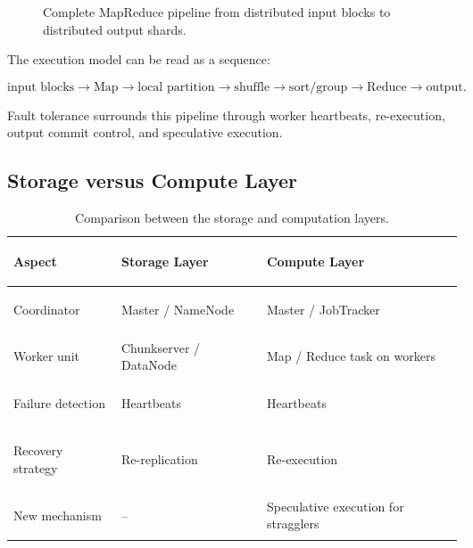 \documentclass[11pt,a4paper,oneside]{book}
\begin{document}
\begin{figure}[htbp]
\centering
{}
\caption{Complete MapReduce pipeline from distributed input blocks to distributed output shards.}
\label{fig:full-pipeline}
\end{figure}

The execution model can be read as a sequence:

\[
\text{input blocks}
\rightarrow
\text{Map}
\rightarrow
\text{local partition}
\rightarrow
\text{shuffle}
\rightarrow
\text{sort/group}
\rightarrow
\text{Reduce}
\rightarrow
\text{output}.
\]

Fault tolerance surrounds this pipeline through worker heartbeats, re-execution, output commit control, and speculative execution.

\subsection{Storage versus Compute Layer}

\begin{table}[htbp]
\centering
\caption{Comparison between the storage and computation layers.}
\label{tab:storage-compute}
\begin{tabularx}{\textwidth}{>{\bfseries\raggedright\arraybackslash}p{3.1cm} Y Y}
\toprule
{}
Aspect & Storage Layer & Compute Layer \\
\midrule
Coordinator & Master / NameNode & Master / JobTracker \\
Worker unit & Chunkserver / DataNode & Map / Reduce task on workers \\
Failure detection & Heartbeats & Heartbeats \\
Recovery strategy & Re-replication & Re-execution \\
New mechanism & -- & Speculative execution for stragglers \\
\bottomrule
\end{tabularx}
\end{table}
\end{document}

